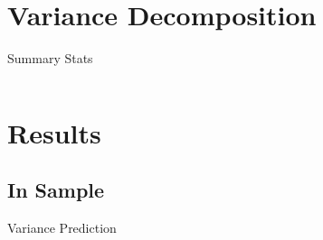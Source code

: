 \documentclass{beamer}
\begin{document}
\section{Variance Decomposition}


\begin{frame}{Summary Stats}
	\begin{table}[!htbp] \centering 
		\begin{adjustbox}{width=\textwidth}
			\begin{tabular}{lcccccc} 
				
			\end{tabular}
		\end{adjustbox}
	\end{table}
\end{frame}


\section{Results}
\subsection{In Sample}

\begin{frame}{Variance Prediction}
	\vspace{-12pt}
 \begin{table}
 	\begin{adjustbox}{width=\textwidth,height=4cm}
 	
 	\end{adjustbox}

 \end{table}
\end{frame}
\end{document}
